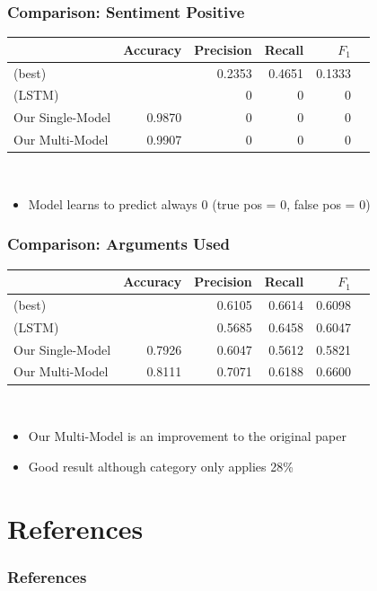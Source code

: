 \documentclass[compress,aspectratio=169]{beamer} %
\begin{document}
\begin{frame}[fragile]
	\frametitle{Comparison: Sentiment Positive}
	\centering
	\begin{tabular}{l r r r r r}
		& Accuracy & Precision & Recall & $F_1$ \\
		\hline
		\cite{Schabus17} (best) & & 0.2353 & 0.4651 & 0.1333 \\
		\cite{Schabus17} (LSTM) & & 0 & 0 & 0\\
		\hline
		Our Single-Model & 0.9870 & 0 & 0 & 0 \\
		Our Multi-Model & 0.9907 & 0 & 0 & 0 \\
	\end{tabular}\\
	\vspace{5mm}
	\begin{itemize}
		\item Model learns to predict always 0 (true pos = 0, false pos = 0)
	\end{itemize}
\end{frame}

\begin{frame}[fragile]
	\frametitle{Comparison: Arguments Used}
	\centering
	\begin{tabular}{l r r r r r}
		& Accuracy & Precision & Recall & $F_1$ \\
		\hline
		\cite{Schabus17} (best) & & 0.6105 & 0.6614 & 0.6098 \\
		\cite{Schabus17} (LSTM) & & 0.5685 & 0.6458 & 0.6047\\
		\hline
		Our Single-Model & 0.7926 & 0.6047 & 0.5612 & 0.5821 \\
		Our Multi-Model & 0.8111 & 0.7071 & 0.6188 & 0.6600 \\
	\end{tabular}\\
	\vspace{5mm}
	\begin{itemize}
		\item Our Multi-Model is an improvement to the original paper
		\item Good result although category only applies 28\%
	\end{itemize}
\end{frame}


\section*{References}

\begin{frame}[t]%
	\frametitle{References}

	\tiny%
	
	
\end{frame}
\end{document}
